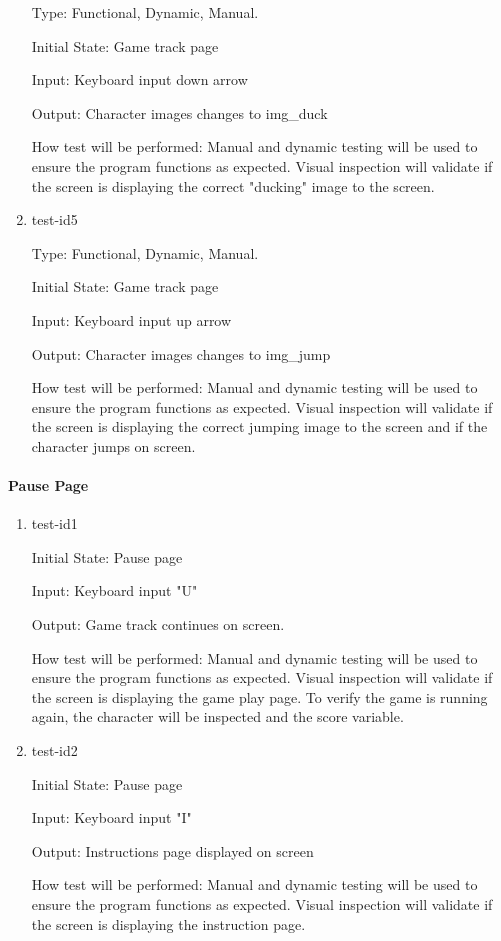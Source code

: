 \documentclass[12pt, titlepage]{article}
\begin{document}
\begin{enumerate}
Type: Functional, Dynamic, Manual.

Initial State: Game track page

Input: Keyboard input down arrow 

Output: Character images changes to img\_duck

How test will be performed: Manual and dynamic testing will be used to ensure the program functions as expected. Visual inspection will validate if the screen is displaying the correct "ducking" image to the screen.

\item{test-id5\\}

Type: Functional, Dynamic, Manual.

Initial State: Game track page

Input: Keyboard input up arrow

Output: Character images changes to img\_jump

How test will be performed: Manual and dynamic testing will be used to ensure the program functions as expected. Visual inspection will validate if the screen is displaying the correct jumping image to the screen and if the character jumps on screen.



\end{enumerate}


\paragraph{Pause Page}
\begin{enumerate}
	\item{test-id1\\}
	
	Initial State: Pause page
	
	Input: Keyboard input "U"
	
	Output: Game track continues on screen. 
	
	How test will be performed: Manual and dynamic testing will be used to ensure the program functions as expected. Visual inspection will validate if the screen is displaying the game play page. To verify the game is running again, the character will be inspected and the score variable.  
	
	\item{test-id2\\}
	
	Initial State: Pause page
	
	Input: Keyboard input "I"
	
	Output: Instructions page displayed on screen 
	
	How test will be performed: Manual and dynamic testing will be used to ensure the program functions as expected. Visual inspection will validate if the screen is displaying the instruction page.
\end{enumerate}
\end{document}
